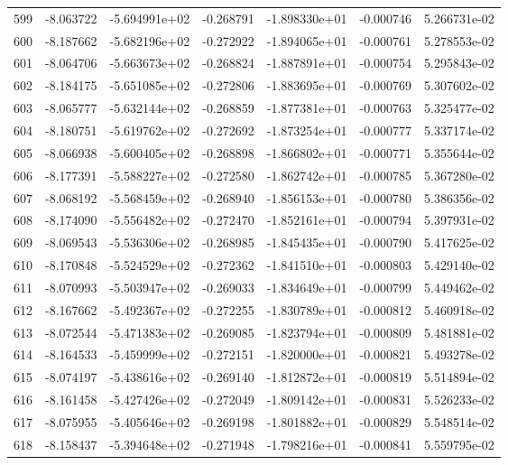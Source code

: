 \begin{tabular}{rrrrrrr}
 599 &  -8.063722 & -5.694991e+02 & -0.268791 & -1.898330e+01 &   -0.000746 &  5.266731e-02 \\
 600 &  -8.187662 & -5.682196e+02 & -0.272922 & -1.894065e+01 &   -0.000761 &  5.278553e-02 \\
 601 &  -8.064706 & -5.663673e+02 & -0.268824 & -1.887891e+01 &   -0.000754 &  5.295843e-02 \\
 602 &  -8.184175 & -5.651085e+02 & -0.272806 & -1.883695e+01 &   -0.000769 &  5.307602e-02 \\
 603 &  -8.065777 & -5.632144e+02 & -0.268859 & -1.877381e+01 &   -0.000763 &  5.325477e-02 \\
 604 &  -8.180751 & -5.619762e+02 & -0.272692 & -1.873254e+01 &   -0.000777 &  5.337174e-02 \\
 605 &  -8.066938 & -5.600405e+02 & -0.268898 & -1.866802e+01 &   -0.000771 &  5.355644e-02 \\
 606 &  -8.177391 & -5.588227e+02 & -0.272580 & -1.862742e+01 &   -0.000785 &  5.367280e-02 \\
 607 &  -8.068192 & -5.568459e+02 & -0.268940 & -1.856153e+01 &   -0.000780 &  5.386356e-02 \\
 608 &  -8.174090 & -5.556482e+02 & -0.272470 & -1.852161e+01 &   -0.000794 &  5.397931e-02 \\
 609 &  -8.069543 & -5.536306e+02 & -0.268985 & -1.845435e+01 &   -0.000790 &  5.417625e-02 \\
 610 &  -8.170848 & -5.524529e+02 & -0.272362 & -1.841510e+01 &   -0.000803 &  5.429140e-02 \\
 611 &  -8.070993 & -5.503947e+02 & -0.269033 & -1.834649e+01 &   -0.000799 &  5.449462e-02 \\
 612 &  -8.167662 & -5.492367e+02 & -0.272255 & -1.830789e+01 &   -0.000812 &  5.460918e-02 \\
 613 &  -8.072544 & -5.471383e+02 & -0.269085 & -1.823794e+01 &   -0.000809 &  5.481881e-02 \\
 614 &  -8.164533 & -5.459999e+02 & -0.272151 & -1.820000e+01 &   -0.000821 &  5.493278e-02 \\
 615 &  -8.074197 & -5.438616e+02 & -0.269140 & -1.812872e+01 &   -0.000819 &  5.514894e-02 \\
 616 &  -8.161458 & -5.427426e+02 & -0.272049 & -1.809142e+01 &   -0.000831 &  5.526233e-02 \\
 617 &  -8.075955 & -5.405646e+02 & -0.269198 & -1.801882e+01 &   -0.000829 &  5.548514e-02 \\
 618 &  -8.158437 & -5.394648e+02 & -0.271948 & -1.798216e+01 &   -0.000841 &  5.559795e-02 \\

\end{tabular}
